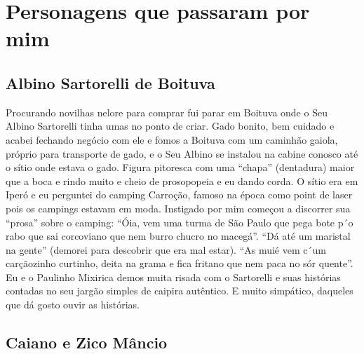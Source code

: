 \documentclass[12pt,brazil,]{book}
\begin{document}
\section{Personagens que passaram por
mim}\label{personagens-que-passaram-por-mim}

\subsection{Albino Sartorelli de
Boituva}\label{albino-sartorelli-de-boituva}

Procurando novilhas nelore para comprar fui parar em Boituva onde o Seu
Albino Sartorelli tinha umas no ponto de criar. Gado bonito, bem cuidado
e acabei fechando negócio com ele e fomos a Boituva com um caminhão
gaiola, próprio para transporte de gado, e o Seu Albino se instalou na
cabine conosco até o sítio onde estava o gado. Figura pitoresca com uma
``chapa'' (dentadura) maior que a boca e rindo muito e cheio de
prosopopeia e eu dando corda. O sítio era em Iperó e eu perguntei do
camping Carroção, famoso na época como point de laser pois os campings
estavam em moda. Instigado por mim começou a discorrer sua ``prosa''
sobre o camping: ``Óia, vem uma turma de São Paulo que pega bote p´o
rabo que sai corcoviano que nem burro chucro no macegá''. ``Dá até um
maristal na gente'' (demorei para descobrir que era mal estar). ``As
muié vem c´um carçãozinho curtinho, deita na grama e fica fritano que
nem paca no sór quente''. Eu e o Paulinho Mixirica demos muita risada
com o Sartorelli e suas histórias contadas no seu jargão simples de
caipira autêntico. E muito simpático, daqueles que dá gosto ouvir as
histórias.

\subsection{Caiano e Zico Mâncio}\label{caiano-e-zico-muxe2ncio}
\end{document}
